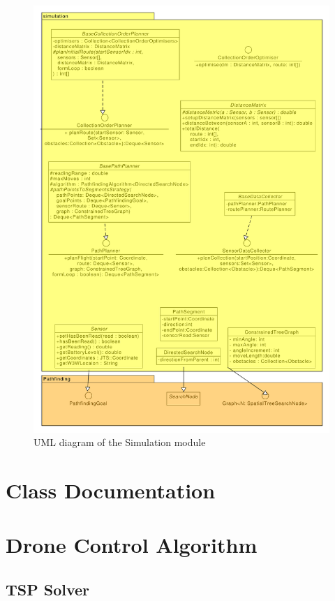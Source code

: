 \documentclass[10pt,a4paper]{article}
\begin{document}
\begin{figure}[H]
    \centering
    \includegraphics[width=\columnwidth]{diagrams/simulation.uxf.pdf}
    \caption{UML diagram of the Simulation module}
    \label{fig:simulation}
\end{figure}
\section{Class Documentation}
\section{Drone Control Algorithm}
\subsection{TSP Solver}
\end{document}

